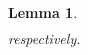 \documentclass[12pt, draftclsnofoot, onecolumn]{IEEEtran}
\newtheorem{lemma}{Lemma}
\begin{document}
\begin{lemma}
\begin{eqnarray}
\end{eqnarray}
respectively.%
\end{lemma}
\end{document}
